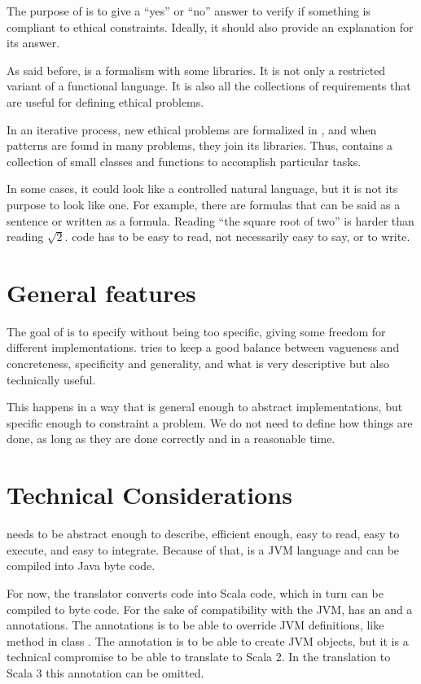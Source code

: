 The purpose of \Soda is to give a ``yes'' or ``no'' answer to verify if something is compliant to ethical constraints.
Ideally, it should also provide an explanation for its answer.

As said before, \Soda is a formalism with some libraries.
It is not only a restricted variant of a functional language.
It is also all the collections of requirements that are useful for defining ethical problems.

In an iterative process, new ethical problems are formalized in \Soda, and when patterns are found in many problems, they join its libraries.
Thus, \Soda contains a collection of small classes and functions to accomplish particular tasks.

In some cases, it could look like a controlled natural language, but it is not its purpose to look like one.
For example, there are formulas that can be said as a sentence or written as a formula.
Reading ``the square root of two'' is harder than reading $\sqrt{2}$.
\Soda code has to be easy to read, not necessarily easy to say, or to write.


\section{General features}

The goal of \Soda is to specify without being too specific, giving some freedom for different implementations.
\Soda tries to keep a good balance between vagueness and concreteness, specificity and generality,
and what is very descriptive but also technically useful.

This happens in a way that is general enough to abstract implementations, but specific enough to constraint a problem.
We do not need to define how things are done, as long as they are done correctly and in a reasonable time.


\section{Technical Considerations}

\Soda needs to be abstract enough to describe, efficient enough, easy to read, easy to execute, and easy to integrate.
Because of that, \Soda is a JVM language and can be compiled into Java byte code.

For now, the translator converts \Soda code into Scala code, which in turn can be compiled to byte code.
For the sake of compatibility with the JVM, \Soda has an \sodaoverride and a \sodanew annotations.
The \sodaoverride annotations is to be able to override JVM definitions, like method  in class .
The \sodanew annotation is to be able to create JVM objects, but it is a technical compromise to be able to translate to Scala 2.
In the translation to Scala 3 this annotation can be omitted.

